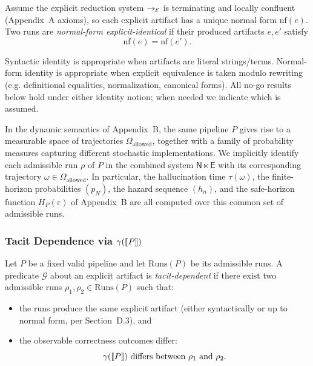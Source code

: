 \begin{definition}
Assume the explicit reduction system $\to_{\mathcal{E}}$ is terminating and locally confluent (Appendix~A axioms), so each explicit artifact has a unique normal form $\mathrm{nf}(e)$.
Two runs are \emph{normal-form explicit-identical} if their produced artifacts $e,e'$ satisfy
\[
\mathrm{nf}(e)=\mathrm{nf}(e').
\]
\end{definition}

\begin{remark}
Syntactic identity is appropriate when artifacts are literal strings/terms. Normal-form identity is appropriate when explicit equivalence is taken modulo rewriting (e.g. definitional equalities, normalization, canonical forms). All no-go results below hold under either identity notion; when needed we indicate which is assumed.
\end{remark}
\begin{remark}
In the dynamic semantics of Appendix~B, the same pipeline $P$ gives rise
to a measurable space of trajectories $\Omega_{\mathrm{allowed}}$,
together with a family of probability measures capturing different
stochastic implementations. We implicitly identify each admissible run
$\rho$ of $P$ in the combined system $\mathsf{N} \ltimes \mathsf{E}$
with its corresponding trajectory
$\omega \in \Omega_{\mathrm{allowed}}$. In particular, the hallucination time $\tau(\omega)$, the finite-horizon probabilities $(p_N)$,
the hazard sequence $(h_n)$, and the safe-horizon function $H_P(\varepsilon)$
of Appendix~B are all computed over this common set of admissible runs.

\end{remark}

\subsubsection{Tacit Dependence via \texorpdfstring{$\gamma(\llbracket P \rrbracket)$}{gamma(sem(P))}}
\begin{definition}
Let $P$ be a fixed valid pipeline and let $\mathrm{Runs}(P)$ be its admissible runs.
A predicate $\mathcal{G}$ about an explicit artifact is \emph{tacit-dependent} if there exist two admissible runs $\rho_1,\rho_2\in\mathrm{Runs}(P)$ such that:
\begin{itemize}
  \item the runs produce the same explicit artifact (either syntactically or up to normal form, per Section~D.3), and
  \item the observable correctness outcomes differ:
  \[
    \gamma(\sem{P})\ \text{differs between}\ \rho_1\ \text{and}\ \rho_2.
  \]
\end{itemize}
\end{definition}

